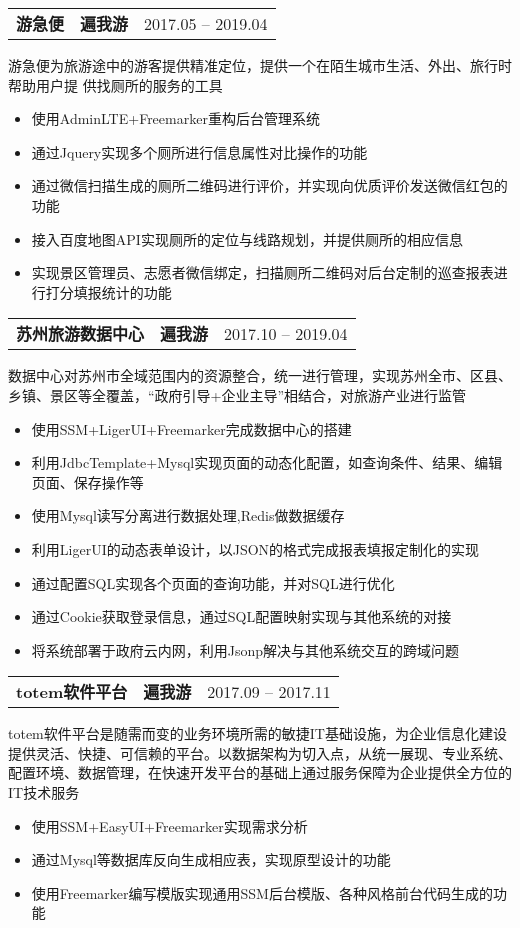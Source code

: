 \documentclass{resume}
\begin{document}
	
	\begin{tabularx}{\textwidth}{@{}X X r@{}}
		\textbf{游急便} & \textbf{遍我游} & 2017.05 -- 2019.04 \\
	\end{tabularx}
	游急便为旅游途中的游客提供精准定位，提供一个在陌生城市生活、外出、旅行时帮助用户提 供找厕所的服务的工具
	\begin{itemize}
		\item 使用AdminLTE+Freemarker重构后台管理系统
		\item 通过Jquery实现多个厕所进行信息属性对比操作的功能
		\item 通过微信扫描生成的厕所二维码进行评价，并实现向优质评价发送微信红包的功能
		\item 接入百度地图API实现厕所的定位与线路规划，并提供厕所的相应信息
		\item 实现景区管理员、志愿者微信绑定，扫描厕所二维码对后台定制的巡查报表进行打分填报统计的功能
	\end{itemize}
	
	\begin{tabularx}{\textwidth}{@{}X X r@{}}
		\textbf{苏州旅游数据中心} & \textbf{遍我游} & 2017.10 -- 2019.04 \\
	\end{tabularx}
	数据中心对苏州市全域范围内的资源整合，统一进行管理，实现苏州全市、区县、乡镇、景区等全覆盖，“政府引导+企业主导”相结合，对旅游产业进行监管
	\begin{itemize}
		\item 使用SSM+LigerUI+Freemarker完成数据中心的搭建
		\item 利用JdbcTemplate+Mysql实现页面的动态化配置，如查询条件、结果、编辑页面、保存操作等
		\item 使用Mysql读写分离进行数据处理,Redis做数据缓存
		\item 利用LigerUI的动态表单设计，以JSON的格式完成报表填报定制化的实现
		\item 通过配置SQL实现各个页面的查询功能，并对SQL进行优化
		\item 通过Cookie获取登录信息，通过SQL配置映射实现与其他系统的对接
		\item 将系统部署于政府云内网，利用Jsonp解决与其他系统交互的跨域问题
	\end{itemize}
	
	\begin{tabularx}{\textwidth}{@{}X X r@{}}
		\textbf{totem软件平台} & \textbf{遍我游} & 2017.09 -- 2017.11 \\
	\end{tabularx}
	totem软件平台是随需而变的业务环境所需的敏捷IT基础设施，为企业信息化建设提供灵活、快捷、可信赖的平台。以数据架构为切入点，从统一展现、专业系统、配置环境、数据管理，在快速开发平台的基础上通过服务保障为企业提供全方位的IT技术服务
	\begin{itemize}
	 	\item 使用SSM+EasyUI+Freemarker实现需求分析
		\item 通过Mysql等数据库反向生成相应表，实现原型设计的功能
		 \item 使用Freemarker编写模版实现通用SSM后台模版、各种风格前台代码生成的功能
	\end{itemize}
\end{document}
